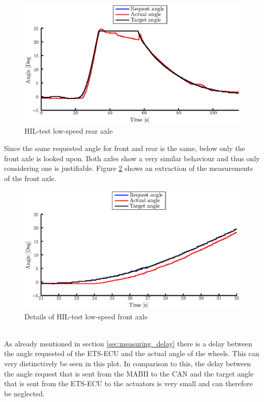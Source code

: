 \documentclass[ExampleMasters.tex]{subfiles}
\begin{document}
\begin{figure}[!htb]
	\centering
	\includegraphics[width=1\linewidth]{figures/HIL002_rear}
	\caption{HIL-test low-speed rear axle}
	
	\label{fig:HIL002_rear}
\end{figure}
Since the same requested angle for front and rear is the same, below only the front axle is looked upon. Both axles show a very similar behaviour and thus only considering one is justifiable.
Figure \ref{fig:HIL002_front_closeup} shows an extraction of the measurements of the front axle. 
\begin{figure}[!htb]
	\centering
	\includegraphics[width=1\linewidth]{figures/HIL002_front_closeup}
	\caption{Details of HIL-test low-speed front axle}
	
	\label{fig:HIL002_front_closeup}
\end{figure} \\
As already mentioned in section \ref{sec:measuring_delay} there is a delay between the angle requested of the \gls{ETS}-\gls{ECU} and the actual angle of the wheels. This can very distinctively be seen in this plot. In comparison to this, the delay between the angle request that is sent from the \gls{MABII} to the \gls{CAN} and the target angle that is sent from the \gls{ETS}-\gls{ECU} to the actuators is very small and can therefore be neglected.\\
\end{document}
